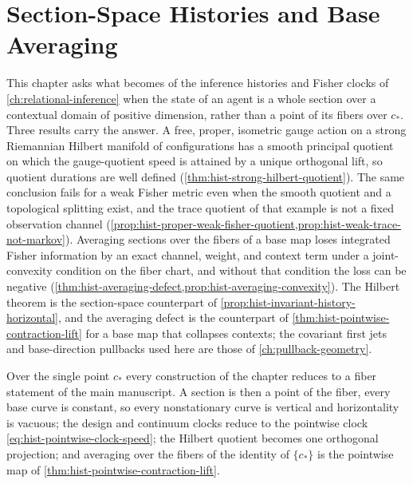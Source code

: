 \chapter{Section-Space Histories and Base Averaging}
\label{ch:section-space-histories}

This chapter asks what becomes of the inference histories and Fisher clocks of
\cref{ch:relational-inference} when the state of an agent is a whole section over
a contextual domain of positive dimension, rather than a point of its fibers
over \(c_*\). Three results carry the answer. A free, proper, isometric gauge
action on a strong Riemannian Hilbert manifold of configurations has a smooth
principal quotient on which the gauge-quotient speed is attained by a unique
orthogonal lift, so quotient durations are well defined
(\cref{thm:hist-strong-hilbert-quotient}). The same conclusion fails for a
weak Fisher metric even when the smooth quotient and a topological splitting
exist, and the trace quotient of that example is not a fixed observation
channel (\cref{prop:hist-proper-weak-fisher-quotient,prop:hist-weak-trace-not-markov}).
Averaging sections over the fibers of a base map loses integrated Fisher
information by an exact channel, weight, and context term under a joint-convexity
condition on the fiber chart, and without that condition the loss can be
negative (\cref{thm:hist-averaging-defect,prop:hist-averaging-convexity}). The
Hilbert theorem is the section-space counterpart of
\cref{prop:hist-invariant-history-horizontal}, and the averaging defect is the
counterpart of \cref{thm:hist-pointwise-contraction-lift} for a base map that
collapses contexts; the covariant first jets and base-direction pullbacks used
here are those of \cref{ch:pullback-geometry}.

Over the single point \(c_*\) every construction of the chapter reduces to a
fiber statement of the main manuscript. A section is then a point of the
fiber, every base curve is constant, so every nonstationary curve is vertical
and horizontality is vacuous; the design and continuum clocks reduce to the
pointwise clock \eqref{eq:hist-pointwise-clock-speed}; the Hilbert quotient
becomes one orthogonal projection; and averaging over the fibers of the identity
of \(\{c_*\}\) is the pointwise map of \cref{thm:hist-pointwise-contraction-lift}.

